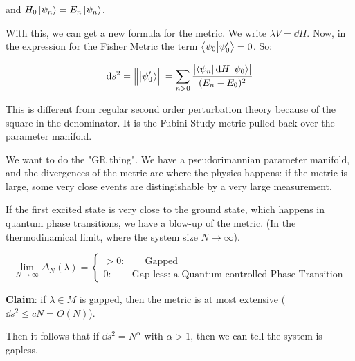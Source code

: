 and \(H_0 \ket{\psi_n} = E_n \ket{\psi_n}\).

With this, we can get a new formula for the metric. We write \(\lambda V = \dd{H} \). Now, in the expression for the Fisher Metric the term  \(\braket{\psi_0}{\psi_0 '} = 0 \). So:

\begin{equation}
  \dd{s^2} = \norm{\ket{\psi_0 '}} = \sum _{n>0}  \frac{\abs{\bra{\psi_n} \dd{H} \ket{\psi_0}} }{(E_n - E_0)^2}
\end{equation}

This is different from regular second order perturbation theory because of the square in the denominator. It is the Fubini-Study metric pulled back over the parameter manifold.

We want to do the "GR thing". We have a pseudorimannian parameter manifold, and the divergences of the metric are where the physics happens: if the metric is large, some very close events are distingishable by a very large measurement.

If the first excited state is very close to the ground state, which happens in quantum phase transitions, we have a blow-up of the metric. (In the thermodinamical limit, where the system size \(N \rightarrow \infty\)).

\begin{equation}
   \lim _ {N \rightarrow \infty} \Delta_N(\lambda) = \begin{cases}
     > 0: \qquad \text{Gapped}  \\
     0: \qquad \text{Gap-less: a Quantum controlled Phase Transition}
 \end{cases}
\end{equation}

\textbf{Claim}: if \(\lambda \in M \) is gapped, then the metric is at most extensive (\(\dd{s^2} \leq cN = O(N) \)).

Then it follows that if \(\dd{s^2} = N^\alpha \) with \(\alpha>1\), then we can tell the system is gapless.

